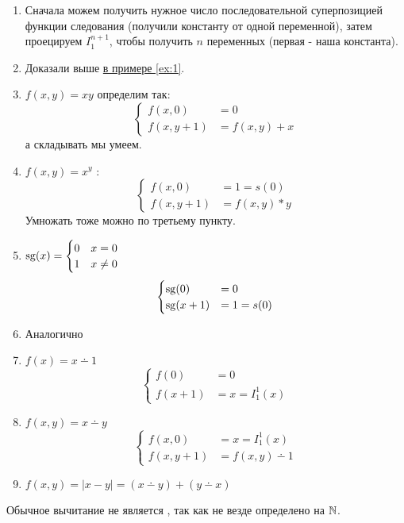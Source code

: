 \begin{proof*}
	\begin{enumerate}
		\item Сначала можем получить нужное число последовательной суперпозицией функции следования (получили константу от одной переменной), затем проецируем $ I^{n + 1}_{1}$, чтобы получить $ n$ переменных (первая - наша константа).
		\item Доказали выше \hyperref[ex:1]{в примере \ref{ex:1}}.
		\item $ f(x, y) = xy$ определим так:
			\[
			\begin{cases}
				f(x, 0) &= 0\\
				f(x, y+1) &= f(x, y) + x
			\end{cases}
			\] 
			а складывать мы умеем.
		\item $ f(x, y) = x^{y}$ :
			\[
			\begin{cases}
				f(x, 0) &= 1 = s(0) \\
				f(x, y+1) &= f(x, y) * y
			\end{cases}
			\] 
			Умножать тоже можно по третьему пункту.
		\item  $ \operatorname{sg}(x) = \begin{cases}
				0&x=0 \\
				1& x\ne 0
		\end{cases}$
		\[
		\begin{cases}
			\operatorname{sg}(0) &= 0 \\
			\operatorname{sg}(x+1) &= 1 = s(0)
		\end{cases}
		\] 
	\item Аналогично
	\item $ f(x) = x \dotminus 1$ 
		\[
		\begin{cases}
			f(0) &=0 \\
			f(x+1) &= x = I^{1}_{1} (x)
		\end{cases}
		\] 
	\item $ f(x, y) = x \dotminus y$
		\[
		\begin{cases}
			f(x, 0) &= x = I^{1}_{1}(x)  \\
			f(x, y+1) &= f(x, y) \dotminus 1
		\end{cases}
		\] 
	\item $ f(x, y) = \lvert x - y \rvert  = (x \dotminus y) + (y \dotminus x)$
    \end{enumerate}
\end{proof*}
\begin{note}
    Обычное вычитание не является \prf, так как не везде определено на $ \mathbb{N}$.
\end{note}



